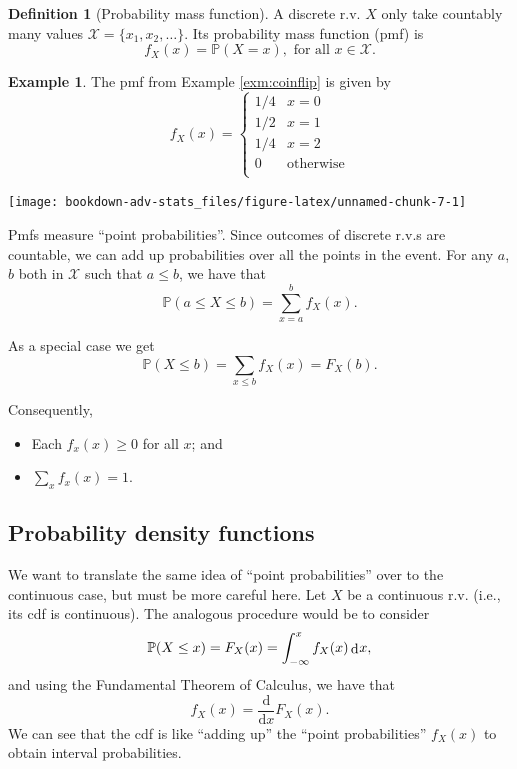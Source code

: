 \documentclass[
]{book}
\providecommand{\tightlist}{%
  \setlength{\itemsep}{0pt}\setlength{\parskip}{0pt}}
\newcommand{\bbP}{\mathbb{P}}
\newcommand{\cX}{{\mathcal X}}
\DeclareMathOperator{\dd}{d}
\newcommand{\dint}{\dd\hspace{0.5pt}\!}
\newcommand{\ddif}{\text{d}}
\theoremstyle{definition}
\newtheorem{definition}{Definition}[chapter]
\theoremstyle{definition}
\newtheorem{example}{Example}[chapter]
\theoremstyle{definition}
\theoremstyle{definition}
\theoremstyle{remark}
\begin{document}
\begin{definition}[Probability mass function]
A discrete r.v. \(X\) only take countably many values \(\cX = \{x_1, x_2,\dots \}\).
Its probability mass function (pmf) is
\[
f_X(x) = \bbP(X=x), \text{ for all } x \in \cX.
\]
\end{definition}

\begin{example}

The pmf from Example \ref{exm:coinflip} is given by
\vspace{-0.5em}
\[
f_X(x) = \begin{cases}
1/4&x=0 \\
1/2&x=1 \\
1/4& x=2\\
0 &\text{otherwise}\\
\end{cases}
\]

\begin{center}\texttt{[image: bookdown-adv-stats\_files/figure-latex/unnamed-chunk-7-1]} \end{center}

\end{example}

Pmfs measure ``point probabilities''. Since outcomes of discrete r.v.s are countable, we can add up probabilities over all the points in the event.
For any \(a\), \(b\) both in \(\cX\) such that \(a \leq b\), we have that
\[
  \bbP(a \leq X \leq b) = \sum_{x=a}^b f_X(x).
\]

As a special case we get
\[
  \bbP(X \leq b) = \sum_{x\leq b} f_X(x) = F_X(b).
\]

Consequently,

\begin{itemize}
\tightlist
\item
  Each \(f_x(x) \geq 0\) for all \(x\); and
\item
  \(\sum_{x} f_x(x) = 1\).
\end{itemize}

\hypertarget{probability-density-functions}{%
\subsection{Probability density functions}\label{probability-density-functions}}

We want to translate the same idea of ``point probabilities'' over to the continuous case, but must be more careful here.
Let \(X\) be a continuous r.v. (i.e., its cdf is continuous).
The analogous procedure would be to consider
\[
  \bbP(X \leq x) = F_X(x) = \int_{-\infty}^x f_X(x) \dint x,
\]
and using the Fundamental Theorem of Calculus, we have that
\[
  f_X(x) = \frac{\ddif}{\ddif x}F_X(x).
\]
We can see that the cdf is like ``adding up'' the ``point probabilities'' \(f_X(x)\) to obtain interval probabilities.
\end{document}
